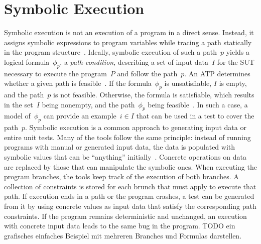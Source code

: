 \documentclass[paper=a4,%
  twoside,%
  BCOR4mm,%
  abstract=true,%
  toc=bibliography,%
  chapterprefix=true,%
  toc=bibliographynumbered,%
  open=right,%
  english,%
  pagesize=pdftex]{scrreprt}
\newcommand{\sut}{\ac{SUT}\xspace}
\begin{document}
\section{Symbolic Execution}
Symbolic execution is not an execution of a program in a direct sense. Instead, it assigns symbolic expressions to program variables while tracing a path statically in the program structure~\cite{McMinn_2004}. Ideally, symbolic execution of such a path~$p$ yields a logical formula~$\phi_{p}$, a \emph{path-condition}, describing a set of input data~$I$ for the \sut necessary to execute the program~$P$ and follow the path~$p$. An \ac{ATP} determines whether a given path is feasible~\cite{Clarke1976,King1976}. If the formula~$\phi_{p}$ is unsatisfiable, $I$ is empty, and the path~$p$ is not feasible. Otherwise, the formula is satisfiable, which results in the set~$I$ being nonempty, and the path~$\phi_{p}$ being feasible~\cite{Ball2015}. In such a case, a model of~$\phi_{p}$ can provide an example~$i \in I$ that can be used in a test to cover the path~$p$. Symbolic execution is a common approach to generating input data or entire unit tests. Many of the tools follow the same principle: instead of running programs with manual or generated input data, the data is populated with symbolic values that can be ``anything'' initially~\cite{cadar2008klee}. Concrete operations on data are replaced by those that can manipulate the symbolic ones. When executing the program branches, the tools keep track of the execution of both branches. A collection of constraints is stored for each brunch that must apply to execute that path. If execution ends in a path or the program crashes, a test can be generated from it by using concrete values as input data that satisfy the corresponding path constraints. If the program remains deterministic and unchanged, an execution with concrete input data leads to the same bug in the program. TODO ein grafisches einfaches Beispiel mit mehreren Branches und Formulas darstellen.
\end{document}
